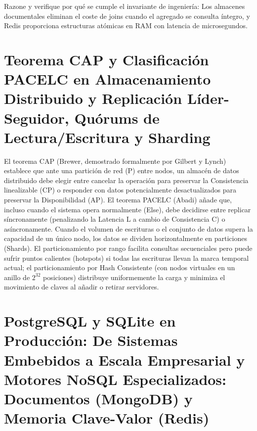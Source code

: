 \documentclass{book}
\begin{document}
\begin{tcolorbox}[title={Autoficha}, studiumcheck, breakable]

Razone y verifique por qué se cumple el invariante de ingeniería: Los almacenes documentales eliminan el coste de joins cuando el agregado se consulta íntegro, y Redis proporciona estructuras atómicas en RAM con latencia de microsegundos.
\end{tcolorbox}

\section{Teorema CAP y Clasificación PACELC en Almacenamiento Distribuido y Replicación Líder-Seguidor, Quórums de Lectura/Escritura y Sharding}

El teorema CAP (Brewer, demostrado formalmente por Gilbert y Lynch) establece que ante una partición de red (P) entre nodos, un almacén de datos distribuido debe elegir entre cancelar la operación para preservar la Consistencia linealizable (CP) o responder con datos potencialmente desactualizados para preservar la Disponibilidad (AP). El teorema PACELC (Abadi) añade que, incluso cuando el sistema opera normalmente (Else), debe decidirse entre replicar síncronamente (penalizando la Latencia L a cambio de Consistencia C) o asíncronamente.
Cuando el volumen de escrituras o el conjunto de datos supera la capacidad de un único nodo, los datos se dividen horizontalmente en particiones (Shards). El particionamiento por rango facilita consultas secuenciales pero puede sufrir puntos calientes (hotspots) si todas las escrituras llevan la marca temporal actual; el particionamiento por Hash Consistente (con nodos virtuales en un anillo de \(2^{32}\) posiciones) distribuye uniformemente la carga y minimiza el movimiento de claves al añadir o retirar servidores.

\section{PostgreSQL y SQLite en Producción: De Sistemas Embebidos a Escala Empresarial y Motores NoSQL Especializados: Documentos (MongoDB) y Memoria Clave-Valor (Redis)}
\end{document}
